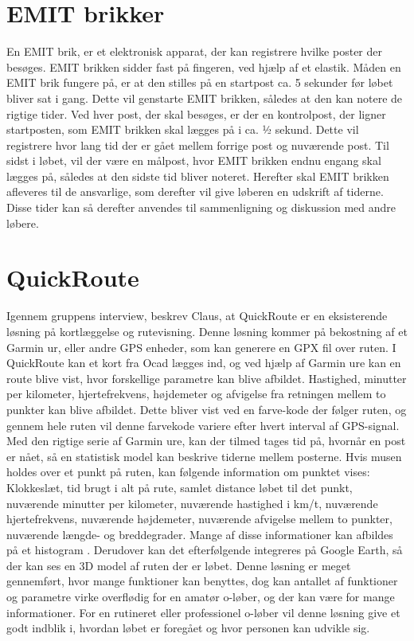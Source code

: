 \section{EMIT brikker}
En EMIT brik, er et elektronisk apparat, der kan registrere hvilke poster der besøges. EMIT brikken sidder fast på fingeren, ved hjælp af et elastik. \newline
Måden en EMIT brik fungere på, er at den stilles på en startpost ca. 5 sekunder før løbet bliver sat i gang. Dette vil genstarte EMIT brikken, således at den kan notere de rigtige tider. 
Ved hver post, der skal besøges, er der en kontrolpost, der ligner startposten, som EMIT brikken skal lægges på i ca. ½ sekund. Dette vil registrere hvor lang tid der er gået mellem forrige post og nuværende post. \newline
Til sidst i løbet, vil der være en målpost, hvor EMIT brikken endnu engang skal lægges på, således at den sidste tid bliver noteret. 
Herefter skal EMIT brikken afleveres til de ansvarlige, som derefter vil give løberen en udskrift af tiderne. Disse tider kan så derefter anvendes til sammenligning og diskussion med andre løbere. \citep{OOK}

\section{QuickRoute}
Igennem gruppens interview, beskrev Claus, at QuickRoute er en eksisterende løsning på kortlæggelse og rutevisning. Denne løsning kommer på bekostning af et Garmin ur, eller andre GPS enheder, som kan generere en GPX fil over ruten. I QuickRoute kan et kort fra Ocad lægges ind, og ved hjælp af Garmin ure kan en route blive vist, hvor forskellige parametre kan blive afbildet. Hastighed, minutter per kilometer, hjertefrekvens, højdemeter og afvigelse fra retningen mellem to punkter kan blive afbildet. Dette bliver vist ved en farve-kode der følger ruten, og gennem hele ruten vil denne farvekode variere efter hvert interval af GPS-signal. Med den rigtige serie af Garmin ure, kan der tilmed tages tid på, hvornår en post er nået, så en statistisk model kan beskrive tiderne mellem posterne. Hvis musen holdes over et punkt på ruten, kan følgende information om punktet vises: Klokkeslæt, tid brugt i alt på rute, samlet distance løbet til det punkt, nuværende minutter per kilometer, nuværende hastighed i km/t, nuværende hjertefrekvens, nuværende højdemeter, nuværende afvigelse mellem to punkter, nuværende længde- og breddegrader. Mange af disse informationer kan afbildes på et histogram \citep{QR}.\newline
Derudover kan det efterfølgende integreres på Google Earth, så der kan ses en 3D model af ruten der er løbet. 
Denne løsning er meget gennemført, hvor mange funktioner kan benyttes, dog kan antallet af funktioner og parametre virke overflødig for en amatør o-løber, og der kan være for mange informationer. For en rutineret eller professionel o-løber vil denne løsning give et godt indblik i, hvordan løbet er foregået og hvor personen kan udvikle sig.


